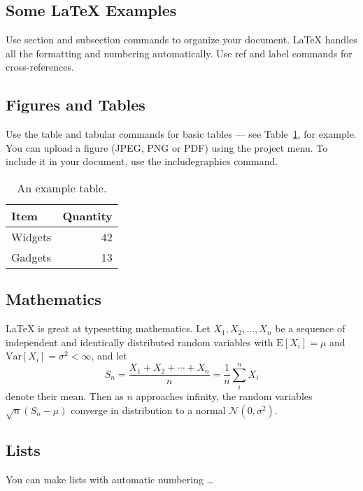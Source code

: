 \documentclass[fleqn,10pt]{wlpeerj}
\begin{document}
\newpage

\subsection*{Some \LaTeX{} Examples}
\label{sec:examples}

Use section and subsection commands to organize your document. \LaTeX{} handles all the formatting and numbering automatically. Use ref and label commands for cross-references.

\subsection*{Figures and Tables}

Use the table and tabular commands for basic tables --- see Table~\ref{tab:widgets}, for example. You can upload a figure (JPEG, PNG or PDF) using the project menu. To include it in your document, use the includegraphics command.

\begin{table}[ht]
	\centering
	\begin{tabular}{l|r}
		Item & Quantity \\\hline
		Widgets & 42 \\
		Gadgets & 13
	\end{tabular}
	\caption{\label{tab:widgets}An example table.}
\end{table}


\subsection*{Mathematics}

\LaTeX{} is great at typesetting mathematics. Let $X_1, X_2, \ldots, X_n$ be a sequence of independent and identically distributed random variables with $\text{E}[X_i] = \mu$ and $\text{Var}[X_i] = \sigma^2 < \infty$, and let
$$S_n = \frac{X_1 + X_2 + \cdots + X_n}{n}
= \frac{1}{n}\sum_{i}^{n} X_i$$
denote their mean. Then as $n$ approaches infinity, the random variables $\sqrt{n}(S_n - \mu)$ converge in distribution to a normal $\mathcal{N}(0, \sigma^2)$.

\subsection*{Lists}

You can make lists with automatic numbering \dots
\end{document}
